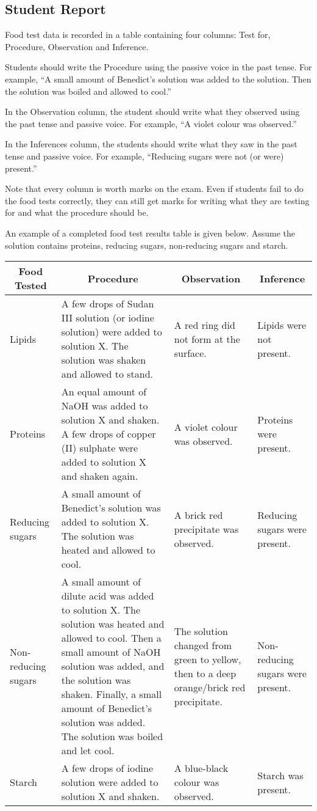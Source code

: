 \subsection{Student Report}
Food test data is recorded in a table containing four columns: Test for, Procedure, Observation and Inference.

Students should write the Procedure using the passive voice in the past tense. For example, ``A small amount of Benedict's solution was added to the solution. Then the solution was boiled and allowed to cool.''

In the Observation column, the student should write what they observed using the past tense and passive voice. For example, ``A violet colour was observed.''

In the Inferences column, the students should write what they saw in the past tense and passive voice. For example, ``Reducing sugars were not (or were) present.''

Note that every column is worth marks on the exam. Even if students fail to do the food tests correctly, they can still get marks for writing what they are testing for and what the procedure should be.

An example of a completed food test results table is given below. Assume the solution contains proteins, reducing sugars, non-reducing sugars and starch.

\begin{center}
\begin{tabular}{|p{3cm}|p{5cm}|p{3cm}|p{3cm}|} \hline
\multicolumn{1}{|c|}{\textbf{Food Tested}}&\multicolumn{1}{c|}{\textbf{Procedure}}&\multicolumn{1}{c|}{\textbf{Observation}}&\multicolumn{1}{c|}{\textbf{Inference}} \\ \hline
Lipids & A few drops of Sudan III solution (or iodine solution) were added to solution X. The solution was shaken and allowed to stand. & A red ring did not form at the surface. & Lipids were not present.\\ \hline
Proteins & An equal amount of NaOH was added to solution X and shaken. A few drops of copper (II) sulphate were added to solution X and shaken again. & A violet colour was observed. & Proteins were present.\\ \hline
Reducing sugars & A small amount of Benedict's solution  was added to solution X. The solution was heated and allowed to cool. & A brick red precipitate was observed. & Reducing sugars were present.\\ \hline
Non-reducing sugars & A small amount of dilute acid was added to solution X. The solution was heated and allowed to cool. Then a small amount of NaOH solution was added, and the solution was shaken. Finally, a small amount of Benedict’s solution was added. The solution was boiled and let cool. & The solution changed from green to yellow, then to a deep orange\slash brick red precipitate. & Non-reducing sugars were present.\\ \hline
Starch & A few drops of iodine solution were added to solution X and shaken. & A blue-black colour was observed. & Starch was present.\\ \hline
\end{tabular}
\end{center}

